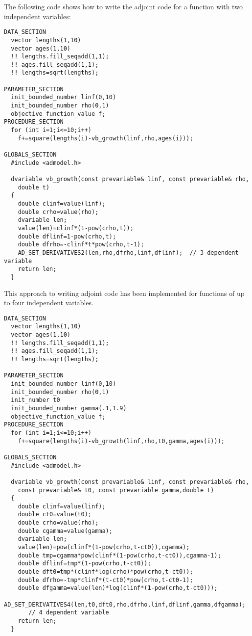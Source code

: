The following code shows how to write the adjoint code for a function with two
independent variables:
\begin{lstlisting}
DATA_SECTION
  vector lengths(1,10)
  vector ages(1,10)
  !! lengths.fill_seqadd(1,1);
  !! ages.fill_seqadd(1,1);
  !! lengths=sqrt(lengths);

PARAMETER_SECTION
  init_bounded_number linf(0,10) 
  init_bounded_number rho(0,1) 
  objective_function_value f;
PROCEDURE_SECTION
  for (int i=1;i<=10;i++)
    f+=square(lengths(i)-vb_growth(linf,rho,ages(i)));
  
GLOBALS_SECTION
  #include <admodel.h>

  dvariable vb_growth(const prevariable& linf, const prevariable& rho, 
    double t)
  {
    double clinf=value(linf);
    double crho=value(rho);
    dvariable len;
    value(len)=clinf*(1-pow(crho,t));
    double dflinf=1-pow(crho,t);
    double dfrho=-clinf*t*pow(crho,t-1);
    AD_SET_DERIVATIVES2(len,rho,dfrho,linf,dflinf);  // 3 dependent variable 
    return len;
  }
\end{lstlisting}
This approach to writing adjoint code has been implemented for functions of
up to four independent variables.
\begin{lstlisting}
DATA_SECTION
  vector lengths(1,10)
  vector ages(1,10)
  !! lengths.fill_seqadd(1,1);
  !! ages.fill_seqadd(1,1);
  !! lengths=sqrt(lengths);

PARAMETER_SECTION
  init_bounded_number linf(0,10) 
  init_bounded_number rho(0,1) 
  init_number t0 
  init_bounded_number gamma(.1,1.9) 
  objective_function_value f;
PROCEDURE_SECTION
  for (int i=1;i<=10;i++)
    f+=square(lengths(i)-vb_growth(linf,rho,t0,gamma,ages(i)));
  
GLOBALS_SECTION
  #include <admodel.h>

  dvariable vb_growth(const prevariable& linf, const prevariable& rho, 
    const prevariable& t0, const prevariable gamma,double t)
  {
    double clinf=value(linf);
    double ct0=value(t0);
    double crho=value(rho);
    double cgamma=value(gamma);
    dvariable len;
    value(len)=pow(clinf*(1-pow(crho,t-ct0)),cgamma);
    double tmp=cgamma*pow(clinf*(1-pow(crho,t-ct0)),cgamma-1);
    double dflinf=tmp*(1-pow(crho,t-ct0));
    double dft0=tmp*(clinf*log(crho)*pow(crho,t-ct0));
    double dfrho=-tmp*clinf*(t-ct0)*pow(crho,t-ct0-1);
    double dfgamma=value(len)*log(clinf*(1-pow(crho,t-ct0)));
    AD_SET_DERIVATIVES4(len,t0,dft0,rho,dfrho,linf,dflinf,gamma,dfgamma); 
       // 4 dependent variable 
    return len;
  }
\end{lstlisting}


